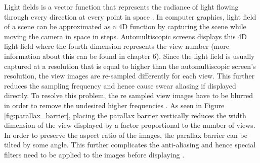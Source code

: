 Light fields is a vector function that represents the radiance of light flowing through every direction at every point in space \cite{ wiki:Light_field}. In computer graphics, light field of a scene can be approximated as a 4D function by capturing the scene while moving the camera in space in steps. Automultiscopic screens displays this 4D light field where the fourth dimension represents the view number (more information about this can be found in chapter 6). Since the light field is usually captured at a resolution that is equal to higher than the automultiscopic screen's resolution, the view images are re-sampled differently for each view. This further reduces the sampling frequency and hence cause swear aliasing if displayed directly. To resolve this problem, the re sampled view images have to be blurred in order to remove the undesired higher frequencies \cite{zwicker2006antialiasing}. As seen in Figure \ref{fig:parallax_barrier}, placing the parallax barrier vertically reduces the width dimension of the view displayed by a factor proportional to the number of views. In order to preserve the aspect ratio of the images, the parallax barrier can be tilted by some angle. This further complicates the anti-aliasing and hence special filters need to be applied to the images before displaying \cite{boev2007crosstalk}.
